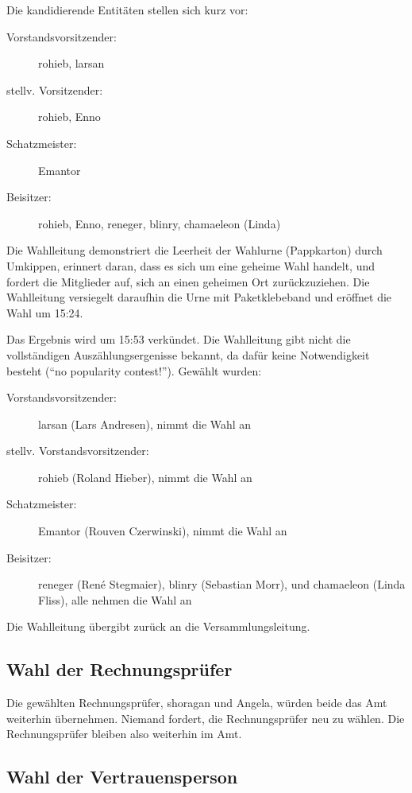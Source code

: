 \documentclass{s0minutes}
\begin{document}
Die kandidierende Entitäten stellen sich kurz vor:
\begin{description}
  \item[Vorstandsvorsitzender:] rohieb, larsan
  \item[stellv. Vorsitzender:] rohieb, Enno
  \item[Schatzmeister:] Emantor
  \item[Beisitzer:] rohieb, Enno, reneger, blinry, chamaeleon (Linda)
\end{description}

Die Wahlleitung demonstriert die Leerheit der Wahlurne (Pappkarton) durch
Umkippen, erinnert daran, dass es sich um eine geheime Wahl handelt, und fordert
die Mitglieder auf, sich an einen geheimen Ort zurückzuziehen. Die Wahlleitung
versiegelt daraufhin die Urne mit Paketklebeband und eröffnet die Wahl um 15:24.


Das Ergebnis wird um 15:53 verkündet. Die Wahlleitung gibt nicht die
vollständigen Auszählungsergenisse bekannt, da dafür keine Notwendigkeit
besteht ("`no popularity contest!"'). Gewählt wurden:

\begin{description}
  \item[Vorstandsvorsitzender:] larsan (Lars Andresen), nimmt die Wahl an
  \item[stellv. Vorstandsvorsitzender:] rohieb (Roland Hieber), nimmt die Wahl
    an
  \item[Schatzmeister:] Emantor (Rouven Czerwinski), nimmt die Wahl an
  \item[Beisitzer:] reneger (René Stegmaier), blinry (Sebastian Morr), und
    chamaeleon (Linda Fliss), alle nehmen die Wahl an
\end{description}

Die Wahlleitung übergibt zurück an die Versammlungsleitung.

\subsection{Wahl der Rechnungsprüfer}

Die gewählten Rechnungsprüfer, shoragan und Angela, würden beide das Amt
weiterhin übernehmen. Niemand fordert, die Rechnungsprüfer neu zu wählen.
Die Rechnungsprüfer bleiben also weiterhin im Amt.

\subsection{Wahl der Vertrauensperson}
\end{document}
